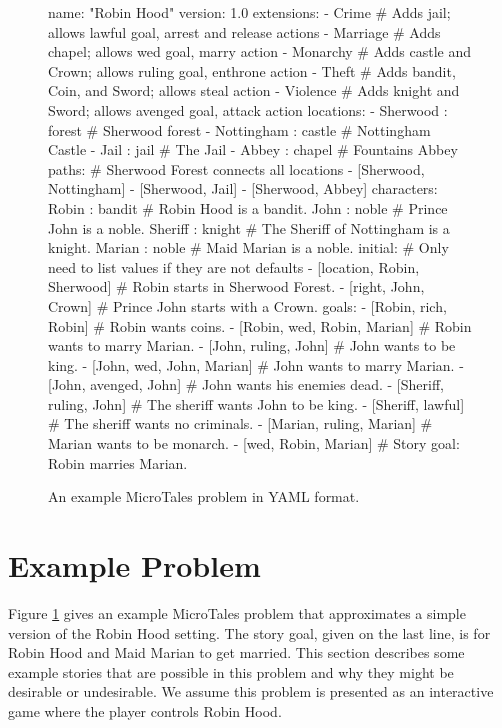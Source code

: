 \documentclass{nilreport}
\begin{document}
\newpage

\begin{figure}[!ht]
{\small
\begin{code}
name: "Robin Hood"
version: 1.0
extensions:
- Crime    # Adds jail; allows lawful goal, arrest and release actions
- Marriage # Adds chapel; allows wed goal, marry action
- Monarchy # Adds castle and Crown; allows ruling goal, enthrone action
- Theft    # Adds bandit, Coin, and Sword; allows steal action
- Violence # Adds knight and Sword; allows avenged goal, attack action
locations:
- Sherwood : forest   # Sherwood forest
- Nottingham : castle # Nottingham Castle
- Jail : jail         # The Jail
- Abbey : chapel      # Fountains Abbey
paths: # Sherwood Forest connects all locations
- [Sherwood, Nottingham]
- [Sherwood, Jail]
- [Sherwood, Abbey]
characters:
  Robin : bandit   # Robin Hood is a bandit.
  John : noble     # Prince John is a noble.
  Sheriff : knight # The Sheriff of Nottingham is a knight.
  Marian : noble   # Maid Marian is a noble.
initial: # Only need to list values if they are not defaults
- [location, Robin, Sherwood] # Robin starts in Sherwood Forest.
- [right, John, Crown]        # Prince John starts with a Crown.
goals:
- [Robin, rich, Robin]        # Robin wants coins.
- [Robin, wed, Robin, Marian] # Robin wants to marry Marian.
- [John, ruling, John]        # John wants to be king.
- [John, wed, John, Marian]   # John wants to marry Marian.
- [John, avenged, John]       # John wants his enemies dead.
- [Sheriff, ruling, John]     # The sheriff wants John to be king.
- [Sheriff, lawful]           # The sheriff wants no criminals.
- [Marian, ruling, Marian]    # Marian wants to be monarch.
- [wed, Robin, Marian]        # Story goal: Robin marries Marian.
\end{code}}
\vspace{-1em}
\caption{An example MicroTales problem in YAML format.}
\label{fig:problemex}
\end{figure}

\section{Example Problem}

Figure \ref{fig:problemex} gives an example MicroTales problem that approximates a simple version of the Robin Hood setting. The story goal, given on the last line, is for Robin Hood and Maid Marian to get married. This section describes some example stories that are possible in this problem and why they might be desirable or undesirable. We assume this problem is presented as an interactive game where the player controls Robin Hood.
\end{document}
